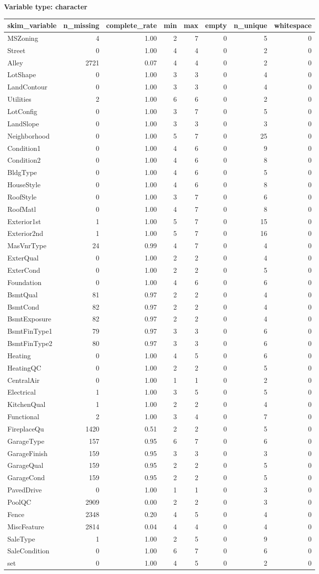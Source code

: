\documentclass[
]{article}
\begin{document}
\textbf{Variable type: character}

\begin{longtable}[]{@{}lrrrrrrr@{}}
\toprule
skim\_variable & n\_missing & complete\_rate & min & max & empty &
n\_unique & whitespace\tabularnewline
\midrule
\endhead
MSZoning & 4 & 1.00 & 2 & 7 & 0 & 5 & 0\tabularnewline
Street & 0 & 1.00 & 4 & 4 & 0 & 2 & 0\tabularnewline
Alley & 2721 & 0.07 & 4 & 4 & 0 & 2 & 0\tabularnewline
LotShape & 0 & 1.00 & 3 & 3 & 0 & 4 & 0\tabularnewline
LandContour & 0 & 1.00 & 3 & 3 & 0 & 4 & 0\tabularnewline
Utilities & 2 & 1.00 & 6 & 6 & 0 & 2 & 0\tabularnewline
LotConfig & 0 & 1.00 & 3 & 7 & 0 & 5 & 0\tabularnewline
LandSlope & 0 & 1.00 & 3 & 3 & 0 & 3 & 0\tabularnewline
Neighborhood & 0 & 1.00 & 5 & 7 & 0 & 25 & 0\tabularnewline
Condition1 & 0 & 1.00 & 4 & 6 & 0 & 9 & 0\tabularnewline
Condition2 & 0 & 1.00 & 4 & 6 & 0 & 8 & 0\tabularnewline
BldgType & 0 & 1.00 & 4 & 6 & 0 & 5 & 0\tabularnewline
HouseStyle & 0 & 1.00 & 4 & 6 & 0 & 8 & 0\tabularnewline
RoofStyle & 0 & 1.00 & 3 & 7 & 0 & 6 & 0\tabularnewline
RoofMatl & 0 & 1.00 & 4 & 7 & 0 & 8 & 0\tabularnewline
Exterior1st & 1 & 1.00 & 5 & 7 & 0 & 15 & 0\tabularnewline
Exterior2nd & 1 & 1.00 & 5 & 7 & 0 & 16 & 0\tabularnewline
MasVnrType & 24 & 0.99 & 4 & 7 & 0 & 4 & 0\tabularnewline
ExterQual & 0 & 1.00 & 2 & 2 & 0 & 4 & 0\tabularnewline
ExterCond & 0 & 1.00 & 2 & 2 & 0 & 5 & 0\tabularnewline
Foundation & 0 & 1.00 & 4 & 6 & 0 & 6 & 0\tabularnewline
BsmtQual & 81 & 0.97 & 2 & 2 & 0 & 4 & 0\tabularnewline
BsmtCond & 82 & 0.97 & 2 & 2 & 0 & 4 & 0\tabularnewline
BsmtExposure & 82 & 0.97 & 2 & 2 & 0 & 4 & 0\tabularnewline
BsmtFinType1 & 79 & 0.97 & 3 & 3 & 0 & 6 & 0\tabularnewline
BsmtFinType2 & 80 & 0.97 & 3 & 3 & 0 & 6 & 0\tabularnewline
Heating & 0 & 1.00 & 4 & 5 & 0 & 6 & 0\tabularnewline
HeatingQC & 0 & 1.00 & 2 & 2 & 0 & 5 & 0\tabularnewline
CentralAir & 0 & 1.00 & 1 & 1 & 0 & 2 & 0\tabularnewline
Electrical & 1 & 1.00 & 3 & 5 & 0 & 5 & 0\tabularnewline
KitchenQual & 1 & 1.00 & 2 & 2 & 0 & 4 & 0\tabularnewline
Functional & 2 & 1.00 & 3 & 4 & 0 & 7 & 0\tabularnewline
FireplaceQu & 1420 & 0.51 & 2 & 2 & 0 & 5 & 0\tabularnewline
GarageType & 157 & 0.95 & 6 & 7 & 0 & 6 & 0\tabularnewline
GarageFinish & 159 & 0.95 & 3 & 3 & 0 & 3 & 0\tabularnewline
GarageQual & 159 & 0.95 & 2 & 2 & 0 & 5 & 0\tabularnewline
GarageCond & 159 & 0.95 & 2 & 2 & 0 & 5 & 0\tabularnewline
PavedDrive & 0 & 1.00 & 1 & 1 & 0 & 3 & 0\tabularnewline
PoolQC & 2909 & 0.00 & 2 & 2 & 0 & 3 & 0\tabularnewline
Fence & 2348 & 0.20 & 4 & 5 & 0 & 4 & 0\tabularnewline
MiscFeature & 2814 & 0.04 & 4 & 4 & 0 & 4 & 0\tabularnewline
SaleType & 1 & 1.00 & 2 & 5 & 0 & 9 & 0\tabularnewline
SaleCondition & 0 & 1.00 & 6 & 7 & 0 & 6 & 0\tabularnewline
set & 0 & 1.00 & 4 & 5 & 0 & 2 & 0\tabularnewline
\bottomrule
\end{longtable}
\end{document}
